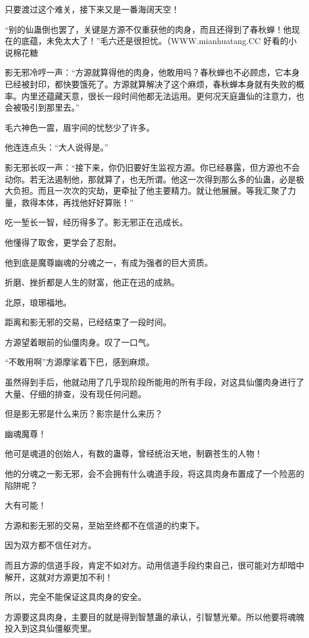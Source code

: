 \begin{this_body}
只要渡过这个难关，接下来又是一番海阔天空！

“别的仙蛊倒也罢了，关键是方源不仅重获他的肉身，而且还得到了春秋蝉！他现在的底蕴，未免太大了！”毛六还是很担忧。（WWW.mianhuatang.CC 好看的小说棉花糖

影无邪冷哼一声：“方源就算得他的肉身，他敢用吗？春秋蝉也不必顾虑，它本身已经被封印，都快要饿死了。方源就算解决了这个麻烦，春秋蝉本身就有失败的概率。内里还蕴藏天意，很长一段时间他都无法运用。更何况天庭蛊仙的注意力，也会被吸引到那里去。”

毛六神色一震，眉宇间的忧愁少了许多。

他连连点头：“大人说得是。”

影无邪长叹一声：“接下来，你仍旧要好生监视方源。你已经暴露，但方源也不会动你。若无法遏制他，那就算了，也无所谓。他这一次得到那么多的仙蛊，必是极大负担。而且一次次的灾劫，更牵扯了他主要精力。就让他展展。等我汇聚了力量，救得本体，再找他好好算账！”

吃一堑长一智，经历得多了。影无邪正在迅成长。

他懂得了取舍，更学会了忍耐。

他到底是魔尊幽魂的分魂之一，有成为强者的巨大资质。

折磨、挫折都是人生的财富，他正在迅的成熟。

北原，琅琊福地。

距离和影无邪的交易，已经结束了一段时间。

方源望着眼前的仙僵肉身。叹了一口气。

“不敢用啊”方源摩挲着下巴，感到麻烦。

虽然得到手后，他就动用了几乎现阶段所能用的所有手段，对这具仙僵肉身进行了大量、仔细的排查，没有现任何问题。

但是影无邪是什么来历？影宗是什么来历？

幽魂魔尊！

他可是魂道的创始人，有数的蛊尊，曾经统治天地，制霸苍生的人物！

他的分魂之一影无邪，会不会拥有什么魂道手段，将这具肉身布置成了一个险恶的陷阱呢？

大有可能！

方源和影无邪的交易，至始至终都不在信道的约束下。

因为双方都不信任对方。

而且方源的信道手段，肯定不如对方。动用信道手段约束自己，很可能对方却暗中解开，这就对方源更加不利！

所以，完全不能保证这具肉身的安全。

方源要这具肉身，主要目的就是得到智慧蛊的承认，引智慧光晕。所以他要将魂魄投入到这具仙僵躯壳里。


\end{this_body}
